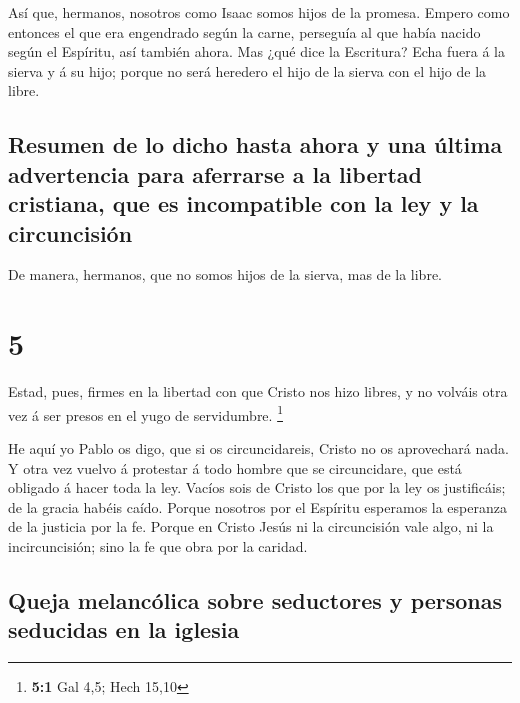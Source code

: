  Así que, hermanos, nosotros como Isaac somos hijos de la
promesa.  Empero como entonces el que era engendrado según
la carne, perseguía al que había nacido según el Espíritu, así también
ahora.  Mas ¿qué dice la Escritura? Echa fuera á la sierva
y á su hijo; porque no será heredero el hijo de la sierva con el hijo de
la libre.

\hypertarget{resumen-de-lo-dicho-hasta-ahora-y-una-uxfaltima-advertencia-para-aferrarse-a-la-libertad-cristiana-que-es-incompatible-con-la-ley-y-la-circuncisiuxf3n}{%
\subsection{Resumen de lo dicho hasta ahora y una última advertencia
para aferrarse a la libertad cristiana, que es incompatible con la ley y
la
circuncisión}\label{resumen-de-lo-dicho-hasta-ahora-y-una-uxfaltima-advertencia-para-aferrarse-a-la-libertad-cristiana-que-es-incompatible-con-la-ley-y-la-circuncisiuxf3n}}

 De manera, hermanos, que no somos hijos de la sierva, mas
de la libre.

\hypertarget{section-4}{%
\section{5}\label{section-4}}

 Estad, pues, firmes en la libertad con que Cristo nos hizo
libres, y no volváis otra vez á ser presos en el yugo de servidumbre.
\footnote{\textbf{5:1} Gal 4,5; Hech 15,10}

 He aquí yo Pablo os digo, que si os circuncidareis, Cristo
no os aprovechará nada.  Y otra vez vuelvo á protestar á
todo hombre que se circuncidare, que está obligado á hacer toda la ley.
 Vacíos sois de Cristo los que por la ley os justificáis; de
la gracia habéis caído.  Porque nosotros por el Espíritu
esperamos la esperanza de la justicia por la fe.  Porque en
Cristo Jesús ni la circuncisión vale algo, ni la incircuncisión; sino la
fe que obra por la caridad.

\hypertarget{queja-melancuxf3lica-sobre-seductores-y-personas-seducidas-en-la-iglesia}{%
\subsection{Queja melancólica sobre seductores y personas seducidas en
la
iglesia}\label{queja-melancuxf3lica-sobre-seductores-y-personas-seducidas-en-la-iglesia}}

